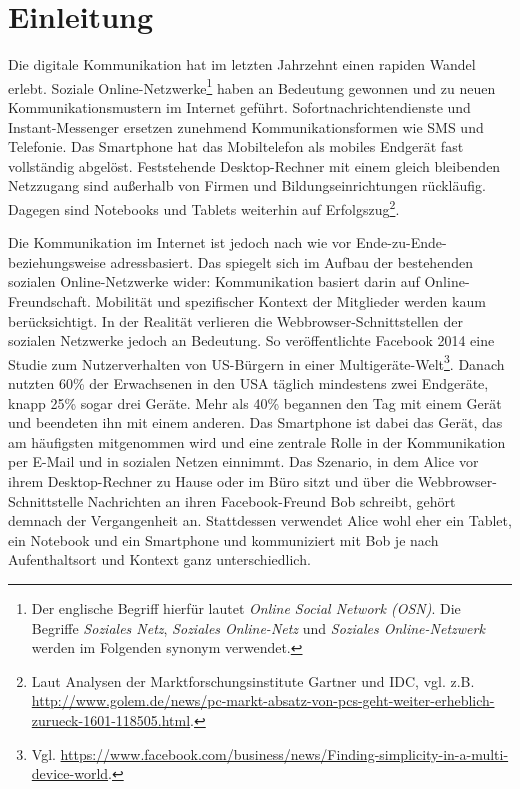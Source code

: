 \chapter{Einleitung}\label{ch:einleitung}
Die digitale Kommunikation hat im letzten Jahrzehnt einen rapiden Wandel erlebt. Soziale Online-Netzwerke\footnote{Der englische Begriff hierfür lautet \textit{Online Social Network (OSN)}. Die Begriffe \textit{Soziales Netz}, \textit{Soziales Online-Netz} und \textit{Soziales Online-Netzwerk} werden im Folgenden synonym verwendet.} haben an Bedeutung gewonnen und zu neuen Kommunikationsmustern im Internet geführt. Sofortnachrichtendienste und Instant-Messenger ersetzen zunehmend Kommunikationsformen wie SMS und Telefonie. Das Smartphone hat das Mobiltelefon als mobiles Endgerät fast vollständig abgelöst. Feststehende Desktop-Rechner mit einem gleich bleibenden Netzzugang sind außerhalb von Firmen und Bildungseinrichtungen rückläufig. Dagegen sind Notebooks und Tablets weiterhin auf Erfolgszug\footnote{Laut Analysen der Marktforschungsinstitute Gartner und IDC, vgl. z.B. \url{http://www.golem.de/news/pc-markt-absatz-von-pcs-geht-weiter-erheblich-zurueck-1601-118505.html}.}. 

Die Kommunikation im Internet ist jedoch nach wie vor Ende-zu-Ende- beziehungsweise adressbasiert. Das spiegelt sich im Aufbau der bestehenden sozialen Online-Netzwerke wider: Kommunikation basiert darin auf Online-Freundschaft. Mobilität und spezifischer Kontext der Mitglieder werden kaum berücksichtigt. In der Realität verlieren die Web\-brow\-ser-Schnittstellen der sozialen Netzwerke jedoch an Bedeutung. So veröffentlichte Facebook 2014 eine Studie zum Nutzerverhalten von US-Bürgern in einer Multigeräte-Welt\footnote{Vgl. \url{https://www.facebook.com/business/news/Finding-simplicity-in-a-multi-device-world}.}. Danach nutzten 60\% der Erwachsenen in den USA täglich mindestens zwei Endgeräte, knapp 25\% sogar drei Geräte. Mehr als 40\% begannen den Tag mit einem Gerät und beendeten ihn mit einem anderen. Das Smartphone ist dabei das Gerät, das am häufigsten mitgenommen wird und eine zentrale Rolle in der Kommunikation per E-Mail und in sozialen Netzen einnimmt. Das Szenario, in dem Alice vor ihrem Desktop-Rechner zu Hause oder im Büro sitzt und über die Webbrowser-Schnittstelle Nachrichten an ihren Facebook-Freund Bob schreibt, gehört demnach der Vergangenheit an. Stattdessen verwendet Alice wohl eher ein Tablet, ein Notebook und ein Smartphone und kommuniziert mit Bob je nach Aufenthaltsort und Kontext ganz unterschiedlich. 

